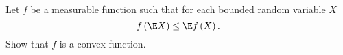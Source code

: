 

 Let $f$ be a measurable function 
such that for each bounded random variable $X$ 
\begin{equation*}
    f \left( \E X \right) \leq \E f\left( X \right).
\end{equation*}
Show that $f$ is a convex function.


